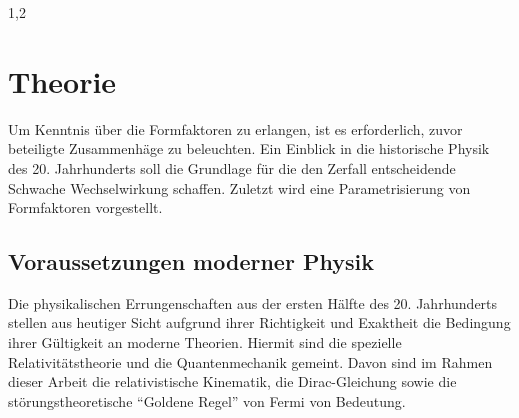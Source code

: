 \documentclass[11pt,a4paper,twoside]{report}
\begin{document}
\begin{spacing}{1,2}
\chapter{Theorie}
Um Kenntnis über die Formfaktoren zu erlangen, ist es erforderlich, zuvor beteiligte Zusammenhäge zu beleuchten. Ein Einblick in die historische Physik
des 20. Jahrhunderts soll die Grundlage für die den Zerfall entscheidende Schwache Wechselwirkung schaffen. Zuletzt wird eine Parametrisierung von Formfaktoren
vorgestellt.

\section{Voraussetzungen moderner Physik}
Die physikalischen Errungenschaften aus der ersten Hälfte des 20. Jahrhunderts stellen aus heutiger Sicht aufgrund ihrer Richtigkeit und Exaktheit die 
Bedingung ihrer Gültigkeit an moderne Theorien.
Hiermit sind die spezielle Relativitätstheorie und die Quantenmechanik gemeint. Davon sind im Rahmen dieser 
Arbeit die relativistische Kinematik, die Dirac-Gleichung sowie die störungstheoretische ``Goldene Regel'' von Fermi
von Bedeutung.


\end{spacing}
\end{document}
